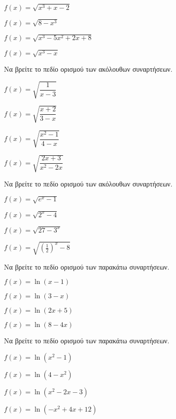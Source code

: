 \documentclass[11pt,a4paper,twocolumn]{article}
\begin{document}
\begin{askhseis}
\begin{alist}
\item $f(x)=\sqrt{x^3+x-2}$
\item $f(x)=\sqrt{8-x^3}$
\item $f(x)=\sqrt{x^3-5x^2+2x+8}$
\item $f(x)=\sqrt{x^3-x}$
\end{alist}
\item Να βρείτε το πεδίο ορισμού των ακόλουθων συναρτήσεων.
\begin{multicols}{2}
\begin{alist}
\item $f(x)=\sqrt{\dfrac{1}{x-3}}$
\item $f(x)=\sqrt{\dfrac{x+2}{3-x}}$
\item $f(x)=\sqrt{\dfrac{x^2-1}{4-x}}$
\item $f(x)=\sqrt{\dfrac{2x+3}{x^2-2x}}$
\end{alist}
\end{multicols}
\item Να βρείτε το πεδίο ορισμού των ακόλουθων συναρτήσεων.
\begin{multicols}{2}
\begin{alist}
\item $f(x)=\sqrt{e^x-1}$
\item $f(x)=\sqrt{2^x-4}$
\item $f(x)=\sqrt{27-3^x}$
\item $f(x)=\sqrt{\left(\frac{1}{2}\right)^x-8}$
\end{alist}
\end{multicols}
\item Να βρείτε το πεδίο ορισμού των παρακάτω συναρτήσεων.
\begin{multicols}{2}
\begin{alist}
\item $f(x)=\ln{(x-1)}$
\item $f(x)=\ln{(3-x)}$
\item $f(x)=\ln{(2x+5)}$
\item $f(x)=\ln{(8-4x)}$
\end{alist}
\end{multicols}
\item Να βρείτε το πεδίο ορισμού των παρακάτω συναρτήσεων.
\begin{alist}
\item $f(x)=\ln{(x^2-1)}$
\item $f(x)=\ln{(4-x^2)}$
\item $f(x)=\ln{(x^2-2x-3)}$
\item $f(x)=\ln{(-x^2+4x+12)}$

\end{alist}
\end{askhseis}
\end{document}
